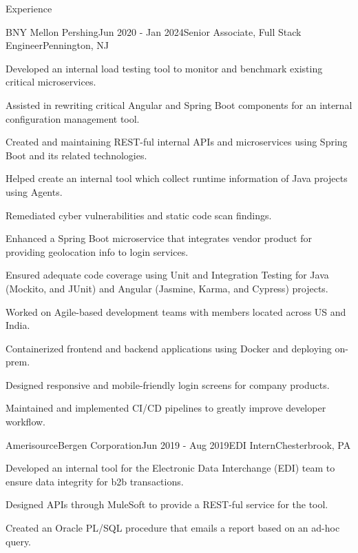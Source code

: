 \documentclass[
11pt, %
]{resume} %
\begin{document}
\begin{rSection}{Experience}

\begin{rSubsection}{BNY Mellon \textbar{} Pershing}{Jun 2020 - Jan 2024}{Senior Associate, Full Stack Engineer}{Pennington, NJ}
\item Developed an internal load testing tool to monitor and benchmark existing critical microservices.
\item Assisted in rewriting critical Angular and Spring Boot components for an internal configuration management tool.
\item Created and maintaining REST-ful internal APIs and microservices using Spring Boot and its related technologies.
\item Helped create an internal tool which collect runtime information of Java projects using Agents.
\item Remediated cyber vulnerabilities and static code scan findings.
\item Enhanced a Spring Boot microservice that integrates vendor product for providing geolocation info to login services.
\item Ensured adequate code coverage using Unit and Integration Testing for Java (Mockito, and JUnit) and Angular (Jasmine, Karma, and Cypress) projects.
\item Worked on Agile-based development teams with members located across US and India.
\item Containerized frontend and backend applications using Docker and deploying on-prem.
\item Designed responsive and mobile-friendly login screens for company products.
\item Maintained and implemented CI/CD pipelines to greatly improve developer workflow.
\end{rSubsection}


\begin{rSubsection}{AmerisourceBergen Corporation}{Jun 2019 - Aug 2019}{EDI Intern}{Chesterbrook, PA}
\item Developed an internal tool for the Electronic Data Interchange (EDI) team to ensure data integrity for b2b transactions.
\item Designed APIs through MuleSoft to provide a REST-ful service for the tool.
\item Created an Oracle PL/SQL procedure that emails a report based on an ad-hoc query.
\end{rSubsection}


\end{rSection}
\end{document}
